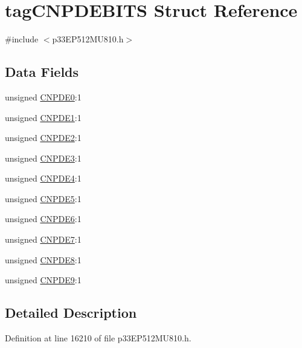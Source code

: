 \hypertarget{structtag_c_n_p_d_e_b_i_t_s}{}\section{tag\+C\+N\+P\+D\+E\+B\+I\+TS Struct Reference}
\label{structtag_c_n_p_d_e_b_i_t_s}


{\ttfamily \#include $<$p33\+E\+P512\+M\+U810.\+h$>$}

\subsection*{Data Fields}
\begin{DoxyCompactItemize}
\item 
unsigned \hyperlink{structtag_c_n_p_d_e_b_i_t_s_ad441be9bd11f762f0ee43161d354a9e1}{C\+N\+P\+D\+E0}\+:1
\item 
unsigned \hyperlink{structtag_c_n_p_d_e_b_i_t_s_a393ec8be1875f5ce01e53f1c2daed70d}{C\+N\+P\+D\+E1}\+:1
\item 
unsigned \hyperlink{structtag_c_n_p_d_e_b_i_t_s_abe940facfcd3d0a09de382a738f1450f}{C\+N\+P\+D\+E2}\+:1
\item 
unsigned \hyperlink{structtag_c_n_p_d_e_b_i_t_s_a7df3972132fbb52e4b30cd6e7c03180a}{C\+N\+P\+D\+E3}\+:1
\item 
unsigned \hyperlink{structtag_c_n_p_d_e_b_i_t_s_a0d600823e060ef44330ec7b628e1ba21}{C\+N\+P\+D\+E4}\+:1
\item 
unsigned \hyperlink{structtag_c_n_p_d_e_b_i_t_s_a6bd1556556c05639360e66fa9f68bd9a}{C\+N\+P\+D\+E5}\+:1
\item 
unsigned \hyperlink{structtag_c_n_p_d_e_b_i_t_s_aa066f35f2062da6a21a951aa31bf86ca}{C\+N\+P\+D\+E6}\+:1
\item 
unsigned \hyperlink{structtag_c_n_p_d_e_b_i_t_s_a2d4e2599c4fb26aad54f292ff3ff49fa}{C\+N\+P\+D\+E7}\+:1
\item 
unsigned \hyperlink{structtag_c_n_p_d_e_b_i_t_s_aa669b8dd88872dce970315081dba4c7e}{C\+N\+P\+D\+E8}\+:1
\item 
unsigned \hyperlink{structtag_c_n_p_d_e_b_i_t_s_a4a1972626e351660a88e9bdb1058de80}{C\+N\+P\+D\+E9}\+:1
\end{DoxyCompactItemize}


\subsection{Detailed Description}


Definition at line 16210 of file p33\+E\+P512\+M\+U810.\+h.



